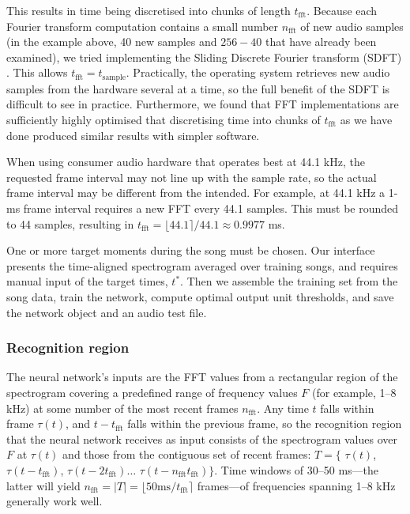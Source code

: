 \documentclass[10pt,letterpaper]{article}
\begin{document}
This results in time being discretised into chunks of length
$t_\mathrm{fft}$.  Because each Fourier transform computation contains
a small number $n_\mathrm{fft}$ of new audio samples (in the example
above, 40 new samples and $256-40$ that have already been examined),
we tried implementing the Sliding Discrete Fourier transform (SDFT)
\cite{Jacobsen2003SlidingDFT}.  This allows
$t_\textrm{fft}=t_\textrm{sample}$.  Practically, the operating system
retrieves new audio samples from the hardware several at a time, so
the full benefit of the SDFT is difficult to see in practice.
Furthermore, we found that FFT implementations are sufficiently highly
optimised that discretising time into chunks of $t_\mathrm{fft}$ as we
have done produced similar results with simpler software.

When using consumer audio hardware that operates best at 44.1 kHz, the
requested frame interval may not line up with the sample rate, so the
actual frame interval may be different from the intended.  For
example, at 44.1 kHz a 1-ms frame interval requires a new FFT every
44.1 samples.  This must be rounded to 44 samples, resulting in
$t_\textrm{fft}=\lfloor 44.1 \rceil / 44.1 \approx 0.9977$ ms.

One or more target moments during the song must be chosen.  Our
interface presents the time-aligned spectrogram averaged over training
songs, and requires manual input of the target times, $t^*$.  Then we
assemble the training set from the song data, train the network,
compute optimal output unit thresholds, and save the network object
and an audio test file.

\subsubsection{Recognition region}
\label{sec:recognitionregion}

The neural network's inputs are the FFT values from a rectangular
region of the spectrogram covering a predefined range of frequency
values $F$ (for example, 1--8 kHz) at some number of the most recent
frames $n_\textrm{fft}$.  Any time $t$ falls within frame $\tau(t)$,
and $t-t_\textrm{fft}$ falls within the previous frame, so the
recognition region that the neural network receives as input consists
of the spectrogram values over $F$ at $\tau(t)$ and those from the
contiguous set of recent frames: $T = \{$ $\tau(t)$,
$\tau(t-t_\textrm{fft})$, $\tau(t-{2t_\textrm{fft}})\ldots$
$\tau(t-n_\textrm{fft}t_\textrm{fft})\}$.  Time windows of 30--50
ms---the latter will yield $n_\textrm{fft} = |T|=\lfloor 50\textrm{
  ms}/t_\textrm{fft}\rceil$ frames---of frequencies spanning 1--8 kHz
generally work well.
\end{document}
